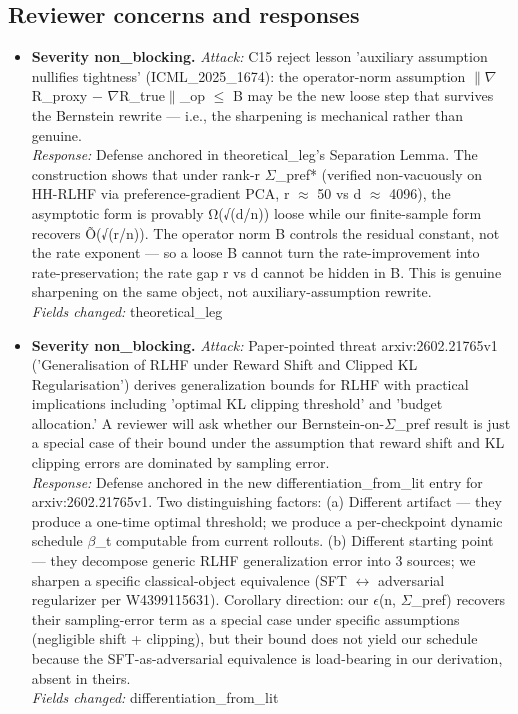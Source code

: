 \documentclass[10pt,a4paper]{article}
\begin{document}
\begin{tcolorbox}[colback=bgskill, colframe=cblue, title=\textbf{NoveltySkill — Idea Card (L3 Oral-Ready)}, breakable]
\section*{Reviewer concerns and responses}
\begin{itemize}[leftmargin=*]
  \item \textbf{Severity non\_blocking.} \emph{Attack:} C15 reject lesson 'auxiliary assumption nullifies tightness' (ICML\_2025\_1674): the operator-norm assumption $\|$$\nabla$R\_proxy − $\nabla$R\_true$\|$\_op $\le$ B may be the new loose step that survives the Bernstein rewrite --- i.e., the sharpening is mechanical rather than genuine. \\ \emph{Response:} Defense anchored in theoretical\_leg's Separation Lemma. The construction shows that under rank-r $\Sigma$\_pref* (verified non-vacuously on HH-RLHF via preference-gradient PCA, r $\approx$ 50 vs d $\approx$ 4096), the asymptotic form is provably Ω(√(d/n)) loose while our finite-sample form recovers Õ(√(r/n)). The operator norm B controls the residual constant, not the rate exponent --- so a loose B cannot turn the rate-improvement into rate-preservation; the rate gap r vs d cannot be hidden in B. This is genuine sharpening on the same object, not auxiliary-assumption rewrite. \\ \emph{Fields changed:} theoretical\_leg
  \item \textbf{Severity non\_blocking.} \emph{Attack:} Paper-pointed threat arxiv:2602.21765v1 ('Generalisation of RLHF under Reward Shift and Clipped KL Regularisation') derives generalization bounds for RLHF with practical implications including 'optimal KL clipping threshold' and 'budget allocation.' A reviewer will ask whether our Bernstein-on-$\Sigma$\_pref result is just a special case of their bound under the assumption that reward shift and KL clipping errors are dominated by sampling error. \\ \emph{Response:} Defense anchored in the new differentiation\_from\_lit entry for arxiv:2602.21765v1. Two distinguishing factors: (a) Different artifact --- they produce a one-time optimal threshold; we produce a per-checkpoint dynamic schedule $\beta$\_t computable from current rollouts. (b) Different starting point --- they decompose generic RLHF generalization error into 3 sources; we sharpen a specific classical-object equivalence (SFT $\leftrightarrow$ adversarial regularizer per W4399115631). Corollary direction: our $\epsilon$(n, $\Sigma$\_pref) recovers their sampling-error term as a special case under specific assumptions (negligible shift + clipping), but their bound does not yield our schedule because the SFT-as-adversarial equivalence is load-bearing in our derivation, absent in theirs. \\ \emph{Fields changed:} differentiation\_from\_lit
\end{itemize}


\end{tcolorbox}
\end{document}
